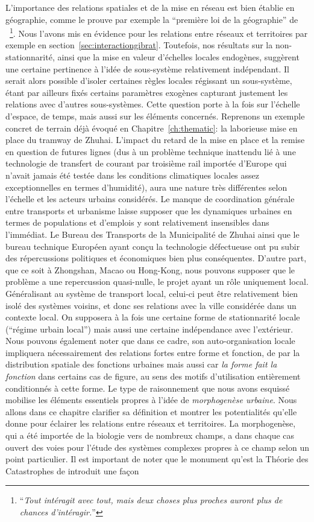 L'importance des relations spatiales et de la mise en réseau est bien établie en géographie, comme le prouve par exemple la ``première loi de la géographie'' de ~\cite{tobler2004first}\footnote{``\textit{Tout intéragit avec tout, mais deux choses plus proches auront plus de chances d'intéragir.}''}. Nous l'avons mis en évidence pour les relations entre réseaux et territoires par exemple en section~\ref{sec:interactiongibrat}. Toutefois, nos résultats sur la non-stationnarité, ainsi que la mise en valeur d'échelles locales endogènes, suggèrent une certaine pertinence à l'idée de sous-système relativement indépendant. Il serait alors possible d'isoler certaines règles locales régissant un sous-système, étant par ailleurs fixés certains paramètres exogènes capturant justement les relations avec d'autres sous-systèmes. Cette question porte à la fois sur l'échelle d'espace, de temps, mais aussi sur les éléments concernés. Reprenons un exemple concret de terrain déjà évoqué en Chapitre~\ref{ch:thematic}: la laborieuse mise en place du tramway de Zhuhai. L'impact du retard de la mise en place et la remise en question de futures lignes (dus à un problème technique inattendu lié à une technologie de transfert de courant par troisième rail importée d'Europe qui n'avait jamais été testée dans les conditions climatiques locales assez exceptionnelles en termes d'humidité), aura une nature très différentes selon l'échelle et les acteurs urbains considérés. Le manque de coordination générale entre transports et urbanisme laisse supposer que les dynamiques urbaines en termes de populations et d'emplois y sont relativement insensibles dans l'immédiat. Le Bureau des Transports de la Municipalité de Zhuhai ainsi que le bureau technique Européen ayant conçu la technologie défectueuse ont pu subir des répercussions politiques et économiques bien plus conséquentes. D'autre part, que ce soit à Zhongshan, Macao ou Hong-Kong, nous pouvons supposer que le problème a une repercussion quasi-nulle, le projet ayant un rôle uniquement local. Généralisant au système de transport local, celui-ci peut être relativement bien isolé des systèmes voisins, et donc ses relations avec la ville considérée dans un contexte local. On supposera à la fois une certaine forme de stationnarité locale (``régime urbain local'') mais aussi une certaine indépendance avec l'extérieur. Nous pouvons également noter que dans ce cadre, son auto-organisation locale impliquera nécessairement des relations fortes entre forme et fonction, de par la distribution spatiale des fonctions urbaines mais aussi car \emph{la forme fait la fonction} dans certains cas de figure, au sens des motifs d'utilisation entièrement conditionnés à cette forme. Le type de raisonnement que nous avons esquissé mobilise les éléments essentiels propres à l'idée de \emph{morphogenèse urbaine}. Nous allons dans ce chapitre clarifier sa définition et montrer les potentialités qu'elle donne pour éclairer les relations entre réseaux et territoires. La morphogenèse, qui a été importée de la biologie vers de nombreux champs, a dans chaque cas ouvert des voies pour l'étude des systèmes complexes propres à ce champ selon un point particulier. Il est important de noter que le monument qu'est la Théorie des Catastrophes de  introduit une façon 
